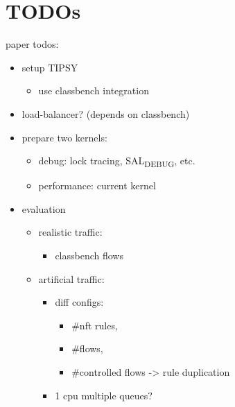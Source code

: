 \documentclass[11pt]{article}
\begin{document}
\section*{TODOs}
\label{sec:orge85f8e6}
paper todos:
\begin{itemize}
\item setup TIPSY
\begin{itemize}
\item use classbench integration
\end{itemize}
\item load-balancer? (depends on classbench)
\item prepare two kernels:
\begin{itemize}
\item debug: lock tracing, SAL\textsubscript{DEBUG}, etc.
\item performance: current kernel
\end{itemize}
\item evaluation
\begin{itemize}
\item realistic traffic:
\begin{itemize}
\item classbench flows
\end{itemize}
\item artificial traffic:
\begin{itemize}
\item diff configs:
\begin{itemize}
\item \#nft rules,
\item \#flows,
\item \#controlled flows -> rule duplication
\end{itemize}
\item 1 cpu multiple queues?
\end{itemize}
\end{itemize}
\end{itemize}
\end{document}
